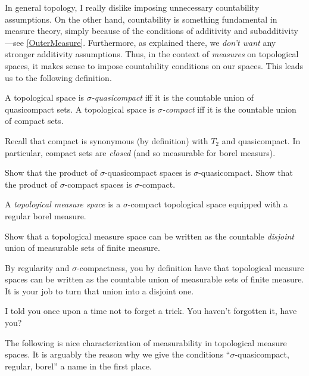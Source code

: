 In general topology, I really dislike imposing unnecessary countability assumptions.  On the other hand, countability is something fundamental in measure theory, simply because of the conditions of additivity and subadditivity---see \cref{OuterMeasure}.  Furthermore, as explained there, we \emph{don't want} any stronger additivity assumptions.  Thus, in the context of \emph{measures} on topological spaces, it makes sense to impose countability conditions on our spaces.  This leads us to the following definition.
\begin{dfn}\label{SigmaQuasicompact}
A topological space is \emph{$\sigma$-quasicompact} iff it is the countable union of quasicompact sets.  A topological space is \emph{$\sigma$-compact} iff it is the countable union of compact sets.
\begin{rmk}
Recall that compact is synonymous (by definition) with $T_2$ and quasicompact.  In particular, compact sets are \emph{closed} (and so measurable for borel measurs).
\end{rmk}
\end{dfn}
\begin{exr}\label{SigmaProductSigma}
Show that the product of $\sigma$-quasicompact spaces is $\sigma$-quasicompact.  Show that the product of $\sigma$-compact spaces is $\sigma$-compact.
\end{exr}
\begin{dfn}\label{TopologicalMeasureSpace}
A \emph{topological measure space} is a $\sigma$-compact topological space equipped with a regular borel measure.
\end{dfn}
\begin{exr}\label{SigmaFinite}
Show that a topological measure space can be written as the countable \emph{disjoint} union of measurable sets of finite measure.
\begin{rmk}
By regularity and $\sigma$-compactness, you by definition have that topological measure spaces can be written as the countable union of measurable sets of finite measure.  It is your job to turn that union into a disjoint one.
\end{rmk}
\begin{rmk}
I told you once upon a time not to forget a trick.  You haven't forgotten it, have you?
\end{rmk}
\end{exr}
The following is nice characterization of measurability in topological measure spaces.  It is arguably the reason why we give the conditions ``$\sigma$-quasicompact, regular, borel'' a name in the first place.
